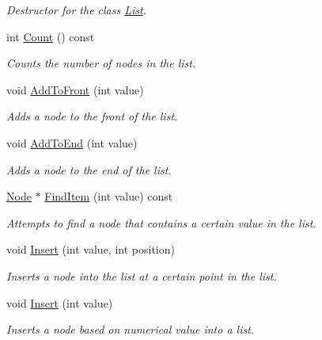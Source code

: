 \begin{DoxyCompactItemize}
\begin{DoxyCompactList}\small\item\em Destructor for the class \hyperlink{class_c_s170_1_1_list_lab_1_1_list}{List}. \end{DoxyCompactList}\item 
int \hyperlink{class_c_s170_1_1_list_lab_1_1_list_a1e53a5b39625df166f46b745545fa3a6}{Count} () const 
\begin{DoxyCompactList}\small\item\em Counts the number of nodes in the list. \end{DoxyCompactList}\item 
void \hyperlink{class_c_s170_1_1_list_lab_1_1_list_ae0d1edbf73012bb977c8e332667fb592}{Add\-To\-Front} (int value)
\begin{DoxyCompactList}\small\item\em Adds a node to the front of the list. \end{DoxyCompactList}\item 
void \hyperlink{class_c_s170_1_1_list_lab_1_1_list_a54d4c8da98dee27d5d837211b9920a88}{Add\-To\-End} (int value)
\begin{DoxyCompactList}\small\item\em Adds a node to the end of the list. \end{DoxyCompactList}\item 
\hyperlink{struct_c_s170_1_1_list_lab_1_1_node}{Node} $\ast$ \hyperlink{class_c_s170_1_1_list_lab_1_1_list_a3197e538e9bf890ec28cddb22f0b6f83}{Find\-Item} (int value) const 
\begin{DoxyCompactList}\small\item\em Attempts to find a node that contains a certain value in the list. \end{DoxyCompactList}\item 
void \hyperlink{class_c_s170_1_1_list_lab_1_1_list_a08c1c07a3356cfe4c6c7573b6af03eda}{Insert} (int value, int position)
\begin{DoxyCompactList}\small\item\em Inserts a node into the list at a certain point in the list. \end{DoxyCompactList}\item 
void \hyperlink{class_c_s170_1_1_list_lab_1_1_list_afe8ceeae0c4072e5955216a5018ca0ab}{Insert} (int value)
\begin{DoxyCompactList}\small\item\em Inserts a node based on numerical value into a list. \end{DoxyCompactList}\item 

\end{DoxyCompactItemize}
